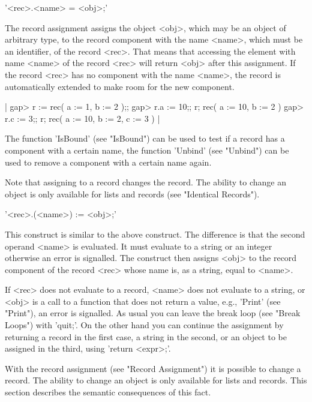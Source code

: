 %

'<rec>.<name> \:= <obj>;'

The record assignment assigns the object <obj>, which may be an object of
arbitrary type, to the record component with the  name <name>, which must
be an  identifier, of the  record <rec>.  That  means  that accessing the
element with name <name> of the record <rec> will return <obj> after this
assignment.  If the  record <rec> has  no component with the name <name>,
the record is automatically extended to make room for the new component.

|    gap> r := rec( a := 1, b := 2 );;
    gap> r.a := 10;;  r;
    rec(
      a := 10,
      b := 2 )
    gap> r.c := 3;;  r;
    rec(
      a := 10,
      b := 2,
      c := 3 ) |

The function 'IsBound' (see  "IsBound") can be used to  test if  a record
has a component with a certain name, the function 'Unbind' (see "Unbind")
can be used to remove a component with a certain name again.

Note  that  assigning to a   record changes the  record.  The  ability to
change an object is only available  for lists and records (see "Identical
Records").

'<rec>.(<name>) := <obj>;'

This construct is similar to the above construct.  The difference is that
the second operand <name> is evaluated.  It must  evaluate to a string or
an integer otherwise an  error is signalled.  The  construct then assigns
<obj>  to  the record component of the record <rec> whose  name is, as  a
string, equal to <name>.

If  <rec> does not  evaluate to a record, <name>   does not evaluate to a
string, or <obj>  is a call  to a function  that does not return a value,
e.g., 'Print'  (see "Print"), an  error  is signalled.   As usual you can
leave the break loop (see "Break Loops") with 'quit;'.  On the other hand
you can continue the assignment by returning a  record in the first case,
a string in the second, or an  object to be assigned  in the third, using
'return <expr>;'.

%

With  the record assignment  (see "Record Assignment")  it is possible to
change a record.  The ability  to change an  object is only available for
lists and  records.  This section describes  the semantic consequences of
this fact.

